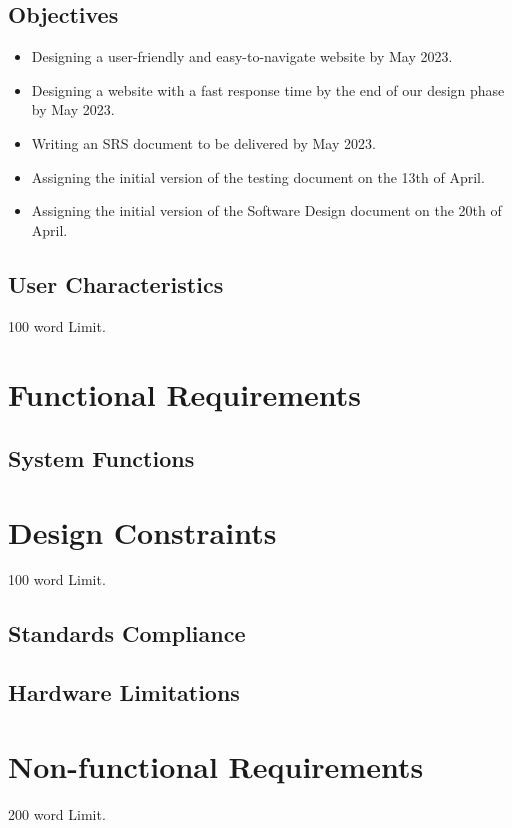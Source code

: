 \documentclass[12pt]{article}
\begin{document}
\subsection{Objectives}
\begin{itemize}
 \item Designing a user-friendly and easy-to-navigate website by May 2023.
 \item Designing a website with a fast response time by the end of our design phase by May 2023.
 \item Writing an SRS document to be delivered by May 2023. 
 \item Assigning the initial version of the testing document on the 13th of April.
 \item Assigning the initial version of the Software Design document on the 20th of April. 
\end{itemize}

\subsection{ User Characteristics}
100 word Limit.


\pagebreak 
\section{Functional Requirements}
\subsection{System Functions}\label{System Functions}

\section{Design Constraints}
100 word Limit.

\subsection{ Standards Compliance}

\subsection{ Hardware Limitations}


\section{Non-functional Requirements}
200 word Limit.
\end{document}
